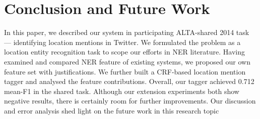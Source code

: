 \documentclass[11pt]{article}
\begin{document}
\section{Conclusion and Future Work}
\label{sec:conclusion}
In this paper, we described our system in participating ALTA-shared 2014 task --- identifying location mentions in Twitter.
We formulated the problem as a location entity recognition task to scope our efforts in NER literature.
Having examined and compared NER feature of existing systems, we proposed our own feature set with justifications.
We further built a CRF-based location mention tagger and analysed the feature contributions.
Overall, our tagger achieved 0.712 mean-F1 in the shared task.
Although our extension experiments both show negative results, there is certainly room for further improvements.
Our discussion and error analysis shed light on the future work in this research topic



\end{document}
